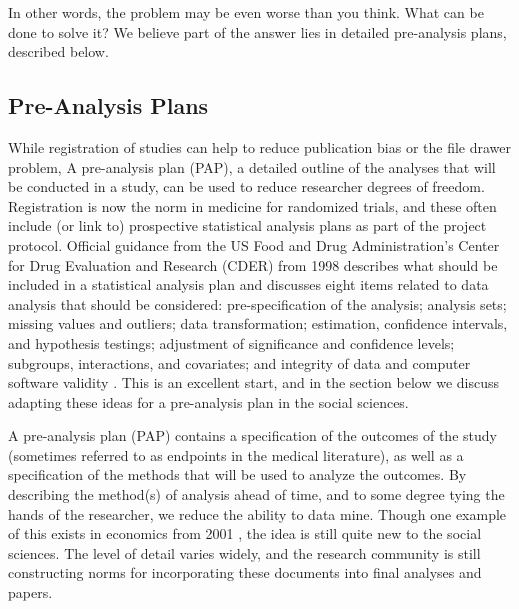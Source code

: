 \documentclass[12pt] {article}
\begin{document}
In other words, the problem may be even worse than you think. What can be
done to solve it? We believe part of the answer lies in detailed
pre-analysis plans, described below.

\subsection{Pre-Analysis
Plans}\label{pre-analysis-plans}

While registration of studies can help to reduce publication bias or the file drawer problem, 
A pre-analysis plan (PAP), a detailed outline of the analyses that will be conducted in a study, can be used to reduce researcher degrees of freedom. Registration is now the norm in medicine for randomized trials, and these often include (or link to) prospective statistical analysis plans as part of the project protocol. Official guidance from the US Food and Drug Administration's Center for Drug Evaluation and Research (CDER) from 1998 describes what should be included in a statistical analysis plan and discusses eight items related to data analysis that should be considered: pre-specification of the analysis; analysis sets; missing values and outliers; data transformation; estimation, confidence intervals, and hypothesis testings; adjustment of significance and confidence levels; subgroups, interactions, and covariates; and integrity of data and computer software validity \citep{food1998guidance}.   %
This is an excellent start, and in the section below we discuss adapting these ideas for a pre-analysis plan in the social sciences.

A pre-analysis plan (PAP) contains a specification of the outcomes of the study (sometimes referred to as endpoints in the medical literature), as well as a specification of the methods that will be used to analyze the outcomes. By describing the
method(s) of analysis ahead of time, and to some degree tying the hands
of the researcher, we reduce the ability to data mine. Though one
example of this exists in economics from 2001 \citep{neumark_employment_2001}, the idea
is still quite new to the social sciences. The level of detail varies
widely, and the research community is still constructing norms for
incorporating these documents into final analyses and papers.
\end{document}
